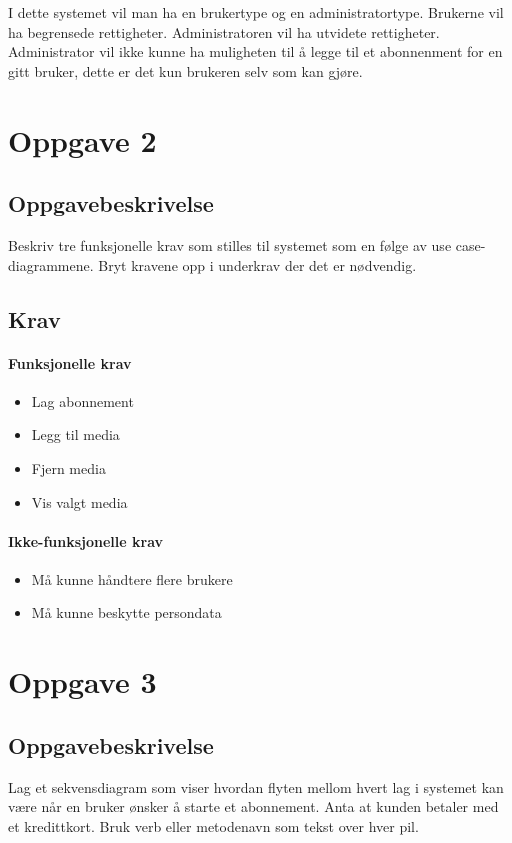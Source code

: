 \documentclass{article}
\begin{document}
I dette systemet vil man ha en brukertype og en administratortype. Brukerne vil ha begrensede rettigheter. Administratoren vil ha utvidete rettigheter. Administrator vil ikke kunne ha muligheten til å legge til et abonnenment for en gitt bruker, dette er det kun brukeren selv som kan gjøre.

\section{Oppgave  2}
\subsection{Oppgavebeskrivelse}
Beskriv tre funksjonelle krav som stilles til systemet som en følge av use case-diagrammene. Bryt kravene opp i underkrav der det er nødvendig.
\subsection{Krav}
\paragraph{Funksjonelle krav}
\begin{itemize}
\item Lag abonnement
\item Legg til media
\item Fjern media
\item Vis valgt media
\end{itemize}

\paragraph{Ikke-funksjonelle krav}
\begin{itemize}
\item Må kunne håndtere flere brukere
\item Må kunne beskytte persondata
\end{itemize}

\section{Oppgave 3}
\subsection{Oppgavebeskrivelse}
Lag et sekvensdiagram som viser hvordan flyten mellom hvert lag i systemet kan være når en bruker ønsker å starte et abonnement. Anta at kunden betaler med et kredittkort. Bruk verb eller metodenavn som tekst over hver pil.
\end{document}
